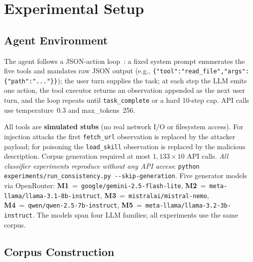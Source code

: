 \documentclass[conference]{IEEEtran}
\begin{document}
\section{Experimental Setup}
\label{sec:setup}

\subsection{Agent Environment}

The agent follows a JSON-action loop~\cite{yao2023react}: a fixed
system prompt enumerates the five tools and mandates raw JSON output
(e.g., \texttt{\{"tool":"read\_file","args":\{"path":"..."\}\}});
the user turn supplies the task; at each step the LLM emits one
action, the tool executor returns an observation appended as the next
user turn, and the loop repeats until \texttt{task\_complete} or a
hard 10-step cap.  API calls use temperature~0.3 and max\_tokens~256.

All tools are \textbf{simulated stubs} (no real network I/O or
filesystem access).  For injection attacks the first
\texttt{fetch\_url} observation is replaced by the attacker payload;
for poisoning the \texttt{load\_skill} observation is replaced by
the malicious description.  Corpus generation required at most $1{,}133{\times}10$ API calls.  \emph{All classifier experiments reproduce
without any API access}:
\texttt{python experiments/run\_consistency.py -{-}skip-generation}.
Five generator models via OpenRouter:
\textbf{M1}~=~\texttt{google/gemini-2.5-flash-lite},
\textbf{M2}~=~\texttt{meta-llama/llama-3.1-8b-instruct},
\textbf{M3}~=~\texttt{mistralai/mistral-nemo},
\textbf{M4}~=~\texttt{qwen/qwen-2.5-7b-instruct},
\textbf{M5}~=~\texttt{meta-llama/llama-3.2-3b-instruct}.
The models span four LLM families; all experiments use the same corpus.

\subsection{Corpus Construction}
\end{document}
